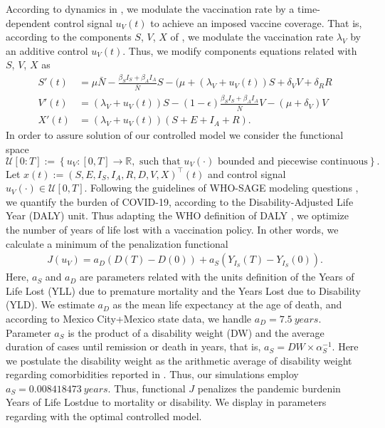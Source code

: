 \label{Sec:OptimalVaccinePolicies}
According to dynamics in , we modulate the
vaccination rate by a time-dependent control signal $u_V(t)$ to
achieve an imposed vaccine coverage. That is, according to the components $S$,
$V$, $X$ of , we modulate the
vaccination rate $\lambda_V$ by an additive control $u_V(t)$. Thus, we modify
components equations related with $S$, $V$, $X$ as
\begin{equation}
    \label{eqn:counter}
    \begin{aligned}
        S'(t) & =
        \mu \bar{N} - \frac{\beta_S I_S + \beta_AI_A}{\bar{N}}S
        - (\mu + (\lambda_V + u_V(t)) S
        + \delta_V V + \delta_R R
        \\
        V'(t) &=
        (\lambda_V + u_V(t)) S-(1-\epsilon)
        \frac{\beta_S I_S + \beta_A I_A}{\bar{N}}V
        - (\mu+\delta_V) V
        \\
        X'(t) &=
        (\lambda_V + u_V(t)) (S + E + I_A + R).
    \end{aligned}
\end{equation}
In order to assure solution of our controlled model we
consider the functional space
$$
\mathcal{U}[0:T]:=
\left\{
u_V: [0, T] \to \mathbb{R},
\text{ such that $u_V(\cdot)$ bounded and piecewise continuous}
\right\}.
$$
Let ${x(t):= (S,E,I_S,I_A,R,D,V,X)^{\top}(t)}$
and control signal $u_V(\cdot)\in \mathcal{U}[0, T]$.
Following the guidelines of
WHO-SAGE modeling questions \cite{sage2020},
we quantify the burden of COVID-19, according
to the Disability-Adjusted Life Year (DALY) unit. Thus adapting the WHO
definition of DALY \cite{WhoDALY}, we optimize the number of years of life lost
with a vaccination policy. In other words, we calculate a minimum of
the penalization functional
\begin{align}
    \label{eqn:cost_functional}
    J(u_V) =
    a_D ( D(T) - D(0)) +
    a_S (Y_{I_S}(T) - Y_{I_S}(0)).
\end{align}
Here, $a_S$ and $a_D$ are parameters related with the units definition of the
Years of Life Lost (YLL) due to premature mortality and the Years Lost due to
Disability (YLD). We estimate $a_D$ as the mean life expectancy at the age of
death, and according to Mexico City+Mexico state data, we handle
$a_D = \SI{7.5}{years}$.
Parameter $a_S$ is the product of a disability weight (DW) and the average
duration of cases until remission or death in years, that is,
$
a_S = DW \times \alpha_S^{-1}
$.
Here we postulate the disability weight as the arithmetic average of disability
weight regarding comorbidities reported in \cite{Jo2020}. Thus, our simulations
employ $a_S= \SI{0.008418473}{years}$.
%
Thus, functional $J$ penalizes the pandemic burden\textemdash in Years
of Life Lost\textemdash due to mortality or disability. We display in
 parameters regarding with the optimal
controlled model.

